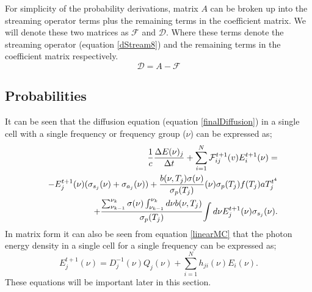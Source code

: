 	For simplicity of the probability derivations, matrix $A$ can be broken up into the streaming operator terms plus the remaining terms in the coefficient matrix. We will denote these two matrices as $\mathcal{F}$ and $\mathcal{D}$. Where these terms denote the streaming operator (equation \ref{dStream8}) and the remaining terms in the coefficient matrix respectively. 
	\begin{equation}
	 \mathcal{D}=A-\mathcal{F}
	\end{equation}
	

\belowSubSecSkip

\subsection{Probabilities}
\label{sec:MonteCarlo-Probabilities}	

\noindent
	\indent It can be seen that the diffusion equation (equation \ref{finalDiffusion})  in  a single cell with a single frequency or frequency group ($\nu$) can be expressed as;
	\begin{eqnarray}
	\label{ProbabilitiesDiffusion}
	& &{1\over{c}}{\Delta{E(\nu)_j}\over{\Delta{t}}} + \sum_{i=1}^N\mathcal{F}_{ij}^{t+1}(v)E^{t+1}_i(\nu)=\nonumber \\& & -E^{t+1}_j(\nu)(\sigma_{s_j}(\nu)+\sigma_{a_j}(\nu))+{b(\nu,T_j)\sigma(\nu)\over{\sigma_p(T_j)}}(\nu)\sigma_p(T_j)f(T_j)aT_j^{t^4}\nonumber \\& & +{\sum_{\nu_{k-1}}^{\nu_k}\sigma(\nu)\int_{\nu_{k-1}}^{\nu_k}d\nu b(\nu,T_j)\over{\sigma_p(T_j)}}{\int{d\nu}E^{t+1}_j(\nu)\sigma_{s_j}(\nu)}.
	\end{eqnarray}
	In matrix form it can also be seen from equation \ref{linearMC} that the photon energy density in a single cell for a single frequency can be expressed as;
	\begin{equation}
	\label{componentMC}
	E^{t+1}_j(\nu)=D_j^{-1}(\nu)Q_j(\nu)+\sum_{i=1}^N{h_{ji}(\nu)E_i(\nu)}.
	\end{equation}
	These equations will be important later in this section.

